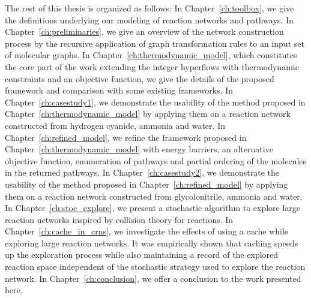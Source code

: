 The rest of this thesis is organized as follows:
In Chapter~\ref{ch:toolbox}, we give the definitions underlying our modeling of reaction networks and pathways.
In Chapter~\ref{ch:preliminaries}, we give an overview of the network construction process by the recursive application of graph transformation rules to an input set of molecular graphs.
In Chapter~\ref{ch:thermodynamic_model}, which constitutes the core part of the work extending the integer hyperflows with thermodynamic constraints and an objective function, we give the details of the proposed framework and comparison with some existing frameworks.
In Chapter~\ref{ch:casestudy1}, we demonstrate the usability of the method proposed in Chapter~\ref{ch:thermodynamic_model} by applying them on a reaction network constructed from hydrogen cyanide, ammonia and water.
In Chapter~\ref{ch:refined_model}, we refine the framework proposed in Chapter~\ref{ch:thermodynamic_model} with energy barriers, an alternative objective function, enumeration of pathways and partial ordering of the molecules in the returned pathways.
In Chapter~\ref{ch:casestudy2}, we demonstrate the usability of the method proposed in Chapter~\ref{ch:refined_model} by applying them on a reaction network constructed from glycolonitrile, ammonia and water.
In Chapter~\ref{ch:stoc_explore}, we present a stochastic algorithm to explore large reaction networks inspired by collision theory for reactions.
In Chapter~\ref{ch:cache_in_crns}, we investigate the effects of using a cache while exploring large reaction networks. It was empirically shown that caching speeds up the exploration process while also maintaining a record of the explored reaction space independent of the stochastic strategy used to explore the reaction network. 
In Chapter~\ref{ch:conclusion}, we offer a conclusion to the work presented here.

